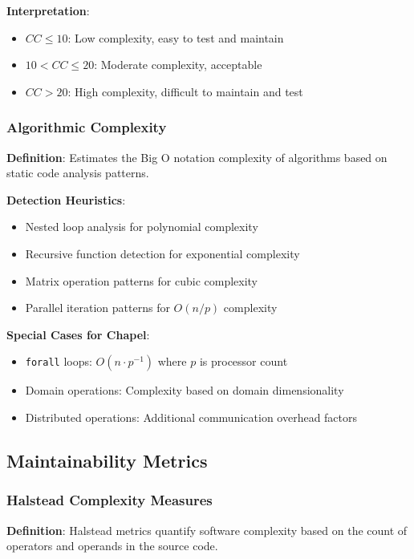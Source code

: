 \documentclass[11pt,a4paper]{article}
\begin{document}
\textbf{Interpretation}:
\begin{itemize}
    \item $CC \leq 10$: Low complexity, easy to test and maintain
    \item $10 < CC \leq 20$: Moderate complexity, acceptable
    \item $CC > 20$: High complexity, difficult to maintain and test
\end{itemize}

\subsubsection{Algorithmic Complexity}

\textbf{Definition}: Estimates the Big O notation complexity of algorithms based on static code analysis patterns.

\textbf{Detection Heuristics}:
\begin{itemize}
    \item Nested loop analysis for polynomial complexity
    \item Recursive function detection for exponential complexity
    \item Matrix operation patterns for cubic complexity
    \item Parallel iteration patterns for $O(n/p)$ complexity
\end{itemize}

\textbf{Special Cases for Chapel}:
\begin{itemize}
    \item \texttt{forall} loops: $O(n \cdot p^{-1})$ where $p$ is processor count
    \item Domain operations: Complexity based on domain dimensionality
    \item Distributed operations: Additional communication overhead factors
\end{itemize}

\subsection{Maintainability Metrics}

\subsubsection{Halstead Complexity Measures}

\textbf{Definition}: Halstead metrics quantify software complexity based on the count of operators and operands in the source code.
\end{document}
